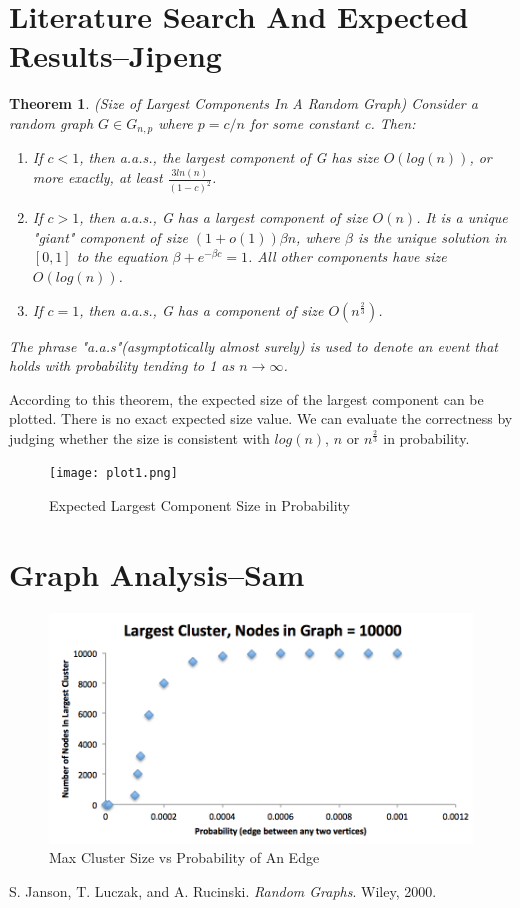\documentclass[a4paper,11pt]{article}
\newtheorem{theorem}{Theorem}
\begin{document}
\maketitle
\thispagestyle{empty}


\section{Literature Search And Expected Results--Jipeng}
\begin{theorem}
\emph{(Size of Largest Components In A Random Graph)}
\label{Lagrange}
Consider a random graph $G \in G_{n,p}$ where $p=c/n$ for some constant c. Then:
\begin{enumerate}
\item If $c<1$, then a.a.s., the largest component of G has size $O(log(n))$, or more exactly, at least $\frac{3ln(n)}{(1-c)^2}$. 
\item If $c>1$, then a.a.s., G has a largest component of size $O(n)$. It is a unique "giant" component of size $(1+o(1))\beta n$, where $\beta$ is the unique solution in $[0,1]$ to the equation $\beta+e^{-\beta c}=1$. All other components have size $O(log(n))$.
\item If $c=1$, then a.a.s., G has a component of size $O(n^{\frac{2}{3}})$.
\end{enumerate}
The phrase "a.a.s"(asymptotically almost surely) is used to denote an event that holds with probability tending to 1 as $n \to \infty$.
\end{theorem}

According to this theorem, the expected size of the largest component can be plotted. There is no exact expected size value. We can evaluate the correctness by judging whether the size is consistent with $log(n)$, $n$ or $n^{\frac{2}{3}}$ in probability. 

\begin{figure}[H]
  \texttt{[image: plot1.png]}
  \caption{Expected Largest Component Size in Probability}
\end{figure}


\section{Graph Analysis--Sam}
\begin{figure}[H]
  \includegraphics[width=6in]{sam_graph1.png}
  \caption{Max Cluster Size vs Probability of An Edge}
\end{figure}


\begin{thebibliography}{9}
  S. Janson, T. Luczak, and A. Rucinski.
  \textit{Random Graphs}.
  Wiley, 2000.
\end{thebibliography}  
\end{document}
